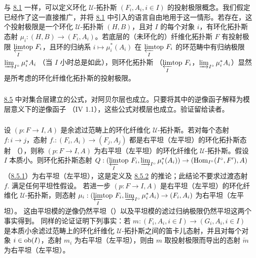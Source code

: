 \subsubsection{}

与 \hyperref[VI.subsec8.1]{8.1} 一样，可以定义环化 $𝒰$-拓扑斯
$(F_i, A_i, i \in I)$ 的投射极限概念。我们假定已经作了这一直接推广，并将
\hyperref[VI.subsec8.1]{8.1} 中引入的语言自由地用于这一情形。若存在，这个投射极限是一个环化
$𝒰$-拓扑斯 $(H, B)$，且对 $I$ 的每个对象 $i$，有环化拓扑斯态射
$\mu_i : (H, B) \to (F_i, A_i)$。若底层的（未环化的）纤维化拓扑斯 $F$ 有投射极限
${\displaystyle{\varprojlim_{I}\!\mbox{\rm top }}} F_i$，且环的归纳系 $i \mapsto \mu_i^{\ast}(A_i)$ 在
${\displaystyle{\varprojlim_{I}\!\mbox{\rm top }}} F_i$ 的环范畴中有归纳极限 $\varinjlim_{I^{\circ}}\mu_i^{\ast} A_i$
（当 $I$ 小时总是如此），则环化拓扑斯
（${\displaystyle{\varprojlim_{I}\!\mbox{\rm top }}} F_i$，$\varinjlim_{I^{\circ}} \mu^{\ast}_i A_i$）显然是所考虑的环化纤维化拓扑斯的投射极限。

\subsubsection{}

\hyperref[VI.subsec8.5]{8.5} 中对集合层建立的公式，对阿贝尔层也成立。只要将其中的逆像函子解释为模层意义下的逆像函子
（IV 1.1），这些公式对模层也成立。验证留给读者。

\subsubsection{}

设 $(p : F \to I, A)$ 是余滤过范畴上的环化纤维化 $𝒰$-拓扑斯。若对每个态射
$f : i \to j$，态射 $f. : (F_i, A_i) \to (F_j, A_j)$ 都是右平坦（\resp{}左平坦）的环化拓扑斯态射
（），则称 $(p : F \to I, A)$ 为右平坦（\resp{}左平坦）的环化纤维化
$𝒰$-拓扑斯。假设 $I$ 本质小。则环化拓扑斯态射
$Q : (\limtop{I} F_i,
\varinjlim_{I^{\circ}} \mu^{\ast}_i (A_i)) \to
(\Hom_{I^{\circ}}(I^{\circ}, F'), A)$\pageoriginale{}
（\hyperref[VI.subsubsec8.5.1]{8.5.1}）为右平坦（\resp{}左平坦），这是定义及
\hyperref[VI.prop8.5.2]{8.5.2} 的推论；此结论不要求过渡态射 $f.$ 满足任何平坦性假设。
若进一步 $(p : F \to I, A)$ 是右平坦（\resp{}左平坦）的环化纤维化 $𝒰$-拓扑斯，则态射
$\mu_i : (\limtop{I} F_i,
\varinjlim_{I^{\circ}} \mu^{\ast}_i A_i) \to (F_i, A_i)$ 为右平坦（\resp{}左平坦）。
这由平坦模的逆像仍然平坦（）以及平坦模的滤过归纳极限仍然平坦这两个事实得到。
同样的论证证明下列事实：若 $m : (F_i, A_i, i \in I) \to (G_i, A_i, i \in I)$
是本质小余滤过范畴上的环化纤维化 $𝒰$-拓扑斯之间的笛卡儿态射，并且对每个对象
$i \in \operatorname{ob} (I)$，态射 $m_i$ 为右平坦（\resp{}左平坦），则由 $m$ 取投射极限而导出的态射
$\underleftarrow{m}$ 为右平坦（\resp{}左平坦）。

